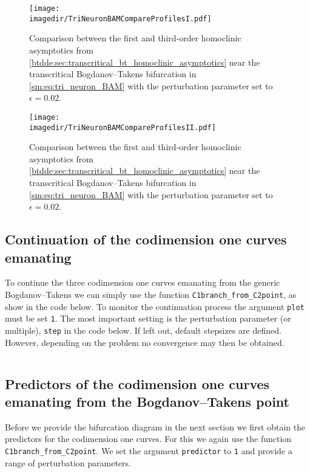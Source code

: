 \begin{figure}[ht]
    \centering
    \texttt{[image: \\imagedir/TriNeuronBAMCompareProfilesI.pdf]}
    \caption{Comparison between the first and third-order homoclinic asymptotics from
    \cref{btdde:sec:transcritical_bt_homoclinic_asymptotics} near the transcritical
        Bogdanov--Takens bifurcation in \cref{sm:eq:tri_neuron_BAM} with the
        perturbation parameter set to $\epsilon=0.02$.}
        \label{sm:fig:TriNeuronBAMCompareProfilesI}
\end{figure}

\begin{figure}[ht]
    \centering
    \texttt{[image: \\imagedir/TriNeuronBAMCompareProfilesII.pdf]}
    \caption{Comparison between the first and third-order homoclinic asymptotics from
    \cref{btdde:sec:transcritical_bt_homoclinic_asymptotics} near the transcritical
        Bogdanov--Takens bifurcation in \cref{sm:eq:tri_neuron_BAM} with the
        perturbation parameter set to $\epsilon=0.02$.}
        \label{sm:fig:TriNeuronBAMCompareProfilesII}
\end{figure}

\subsection{Continuation of the codimension one curves emanating}
To continue the three codimension one curves emanating from the generic
Bogdanov--Takens we can simply use the function
\texttt{C1branch_from_C2point}, as show in the code below. To monitor the
continuation process the argument \texttt{plot} must be set \texttt{1}.
The most important setting is the perturbation parameter (or multiple),
\texttt{step} in the code below. If left out, default stepsizes are defined.
However, depending on the problem no convergence may then be obtained.
\inputminted[firstline=83, lastline=103]{MATLAB}{\pathToDDEBifToolDemos/BAM_neural_network_model/BAMnn.m}

\subsection{Predictors of the codimension one curves emanating from the Bogdanov--Takens point}
Before we provide the bifurcation diagram in the next section we first obtain the predictors
for the codimension one curves. For this we again use the function
\texttt{C1branch_from_C2point}. We set the argument \texttt{predictor} to \texttt{1}
and provide a range of perturbation parameters.
\inputminted[firstline=127, lastline=146]{MATLAB}{\pathToDDEBifToolDemos/BAM_neural_network_model/BAMnn.m}

